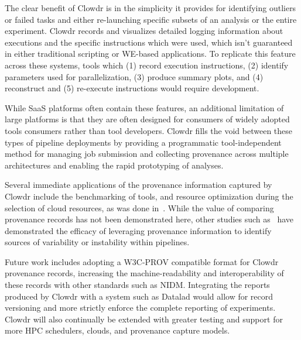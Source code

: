 \documentclass[fleqn,12pt]{SelfArx_ch} %
\begin{document}
The clear benefit of Clowdr is in the simplicity it provides for identifying outliers or failed tasks and either
re-launching specific subsets of an analysis or the entire experiment. Clowdr records and visualizes detailed logging
information about executions and the specific instructions which were used, which isn’t guaranteed in either
traditional scripting or WE-based applications. To replicate this feature across these systems, tools which (1) record
execution instructions, (2) identify parameters used for parallelization, (3) produce summary plots, and (4)
reconstruct and (5) re-execute instructions would require development.

While SaaS platforms often contain these features, an additional limitation of large platforms is that they are often
designed for consumers of widely adopted tools consumers rather than tool developers. Clowdr fills the void between
these types of pipeline deployments by providing a programmatic tool-independent method for managing job submission and
collecting provenance across multiple architectures and enabling the rapid prototyping of analyses.

Several immediate applications of the provenance information captured by Clowdr include the benchmarking of tools, and
resource optimization during the selection of cloud resources, as was done in~\cite{Hasham2018-hn}. While the value of
comparing provenance records has not been demonstrated here, other studies such as~\cite{Salari2018-vs} have
demonstrated the efficacy of leveraging provenance information to identify sources of variability or instability within
pipelines.

Future work includes adopting a W3C-PROV compatible format for Clowdr provenance records, increasing the
machine-readability and interoperability of these records with other standards such as NIDM. Integrating the reports
produced by Clowdr with a system such as Datalad would allow for record versioning and more strictly enforce the
complete reporting of experiments. Clowdr will also continually be extended with greater testing and support for more
HPC schedulers, clouds, and provenance capture models.
\end{document}

